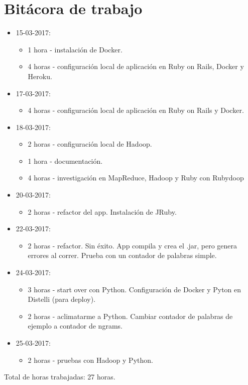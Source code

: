 \documentclass{article}
\begin{document}
\section{Bit\'acora de trabajo}
\begin{itemize}
  \item 15-03-2017:
  \begin{itemize}
    \item 1 hora - instalaci\'on de Docker.
    \item 4 horas - configuraci\'on local de aplicaci\'on en Ruby on Rails, Docker y Heroku.
  \end{itemize}
  \item 17-03-2017:
  \begin{itemize}
    \item 4 horas - configuraci\'on local de aplicaci\'on en Ruby on Rails y Docker.
  \end{itemize}
  \item 18-03-2017:
  \begin{itemize}
    \item 2 horas - configuraci\'on local de Hadoop.
    \item 1 hora - documentaci\'on.
    \item 4 horas - investigaci\'on en MapReduce, Hadoop y Ruby con Rubydoop
  \end{itemize}
  \item 20-03-2017:
  \begin{itemize}
    \item 2 horas - refactor del app. Instalaci\'on de JRuby.
  \end{itemize}
  \item 22-03-2017:
  \begin{itemize}
    \item 2 horas - refactor. Sin \'exito. App compila y crea el .jar, pero genera errores al correr. Prueba con un contador de palabras simple.
  \end{itemize}
  \item 24-03-2017:
  \begin{itemize}
    \item 3 horas - start over con Python. Configuraci\'on de Docker y Pyton en Distelli (para deploy).
    \item 2 horas - aclimatarme a Python. Cambiar contador de palabras de ejemplo a contador de ngrams.
  \end{itemize}
  \item 25-03-2017:
  \begin{itemize}
    \item 2 horas - pruebas con Hadoop y Python.
  \end{itemize}
\end{itemize}
Total de horas trabajadas: 27 horas.
\end{document}
